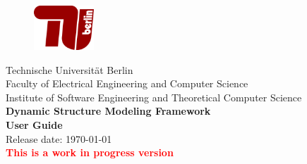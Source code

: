 \begin{figure}[t]
	\centering
	\includegraphics[width=0.2\textwidth]{images/TUB-logo}
	\vspace{1cm}
\end{figure}

\begin{center}
	\huge{Technische Universität Berlin}
	\\[1cm]
	
	\LARGE{Faculty of Electrical Engineering and Computer Science}
	\\[0.3cm]
	\LARGE{Institute of Software Engineering and Theoretical Computer Science}
	\\[2cm]
	
	\textbf{\Huge{Dynamic Structure Modeling Framework}}
	\\[2cm]
	
	\textbf{\Huge{User Guide}}
	\\[3cm]
	
	Release date: \today
	\\
	\Huge{\textbf{\textcolor{red}{This is a work in progress version}}}
\end{center}